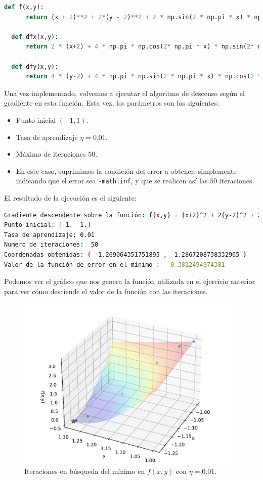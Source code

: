 \documentclass[12pt]{scrartcl}
\begin{document}
{\begin{lstlisting}[language=Python]
  def f(x,y):
	  return (x + 2)**2 + 2*(y - 2)**2 + 2 * np.sin(2 * np.pi * x) * np.sin(2 * np.pi * y)

  def dfx(x,y):
	  return 2 * (x+2) + 4 * np.pi * np.cos(2* np.pi * x) * np.sin(2* np.pi * y)

  def dfy(x,y):
	  return 4 * (y-2) + 4 * np.pi * np.sin(2 * np.pi * x) * np.cos(2 * np.pi * y) 
\end{lstlisting}


Una vez implementado, volvemos a ejecutar el algoritmo de descenso según el gradiente en esta función. Esta vez, los parámetros son los siguientes:
\begin{itemize}
\item Punto inicial $(-1,1)$.
\item Tasa de aprendizaje $\eta = 0.01$.
\item Máximo de iteraciones $50$.
\item En este caso, suprimimos la condición del error a obtener, simplemente indicando que el error sea \lstinline{-math.inf}, y que se
realicen así las $50$ iteraciones.
\end{itemize}

El resultado de la ejecución es el siguiente:

\begin{lstlisting}[language=bash]
Gradiente descendente sobre la función: f(x,y) = (x+2)^2 + 2(y-2)^2 + 2 sin(2pi x) sin(2pi y)
Punto inicial: [-1.  1.]
Tasa de aprendizaje: 0.01
Numero de iteraciones:  50
Coordenadas obtenidas: ( -1.269064351751895 ,  1.2867208738332965 )
Valor de la función de error en el mínimo :  -0.3812494974381
\end{lstlisting}

Podemos ver el gráfico que nos genera la función utilizada en el ejercicio anterior para ver cómo desciende el valor de la función con las iteraciones.

\begin{figure}[H]
  \centering
  \includegraphics[scale=0.6]{media/E1-2-all-moved.pdf}
  \caption{Iteraciones en búsqueda del mínimo en $f(x,y)$ con $\eta = 0.01$.}
\end{figure}

}
\end{document}
